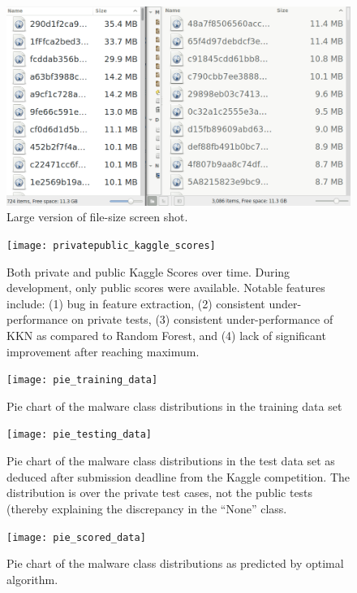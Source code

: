 \documentclass[letterpaper]{article}
\begin{document}
\begin{figure}[h!]
	\centering
	\includegraphics[scale=0.4]{file_size}
    \caption{Large version of file-size screen shot.}
    \label{fig:file_size_large}
\end{figure}

\begin{figure}[h!]
 \centering
 \texttt{[image: privatepublic\_kaggle\_scores]}
 \caption{Both private and public Kaggle Scores over time. During development, only public scores were available. Notable features include: (1) bug in feature extraction, (2) consistent under-performance on private tests, (3) consistent under-performance of  KKN as compared to Random Forest, and (4) lack of significant improvement after reaching maximum.}
 \label{fig:scores_large}
\end{figure}

\begin{figure}[h!]
	\centering
    \texttt{[image: pie\_training\_data]}
    \caption{Pie chart of the malware class distributions in the training data set}
    \label{fig:pie_chart_train_large}
\end{figure}

\begin{figure}[h!]
	\centering
    \texttt{[image: pie\_testing\_data]}
    \caption{Pie chart of the malware class distributions in the test data set as deduced after submission deadline from the Kaggle competition. The distribution is over the private test cases, not the public tests (thereby explaining the discrepancy in the ``None'' class.}
    \label{fig:pie_chart_test_large}
\end{figure}

\begin{figure}[h!]
	\centering
    \texttt{[image: pie\_scored\_data]}
    \caption{Pie chart of the malware class distributions as predicted by optimal algorithm.}
    \label{fig:pie_chart_scored_large}
\end{figure}
\end{document}
